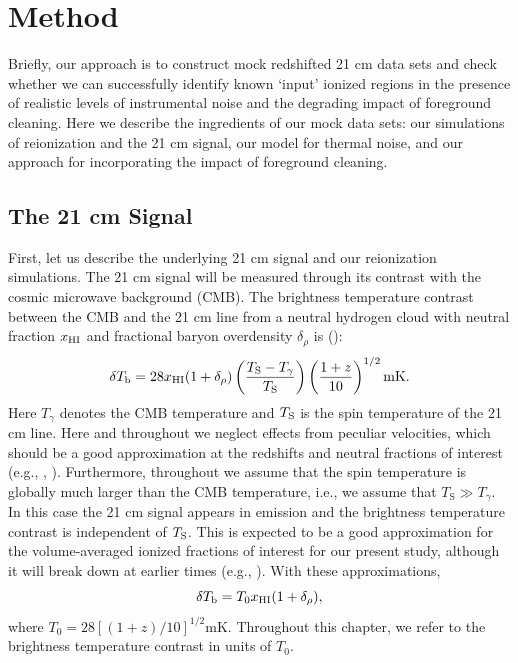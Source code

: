 \section{Method} \label{sec:Bubblemethod}
 
Briefly, our approach is to construct mock redshifted 21 cm data sets and check whether we
can successfully identify known `input' 
ionized regions in the presence of realistic levels of instrumental noise and the degrading impact
of foreground cleaning. Here we describe the ingredients of our mock data sets: our
simulations of reionization and the 21 cm signal, our model for thermal noise, and
our approach for incorporating the impact of foreground cleaning. 


\subsection{The 21 cm Signal} \label{sec:Bubble21cm}

First, let us describe the underlying 21 cm signal and our reionization simulations.
The 21 cm signal will be measured through its contrast with the cosmic microwave background (CMB). The brightness temperature contrast
between the CMB and the 21 cm line from a neutral hydrogen cloud with neutral fraction $x_{\text{HI}}$ and fractional baryon overdensity
$\delta_\rho$ is (\citealt{Zaldarriaga:2003du}):
\begin{equation}
\delta T_{\text{b}} = 28 x_{\text{HI}} (1 + \delta_{\rho})\left( \frac{T_{\text{S}} - T_{\gamma}}{T_{\text{S}}} \right) \left( \frac{1 + z}{10} \right)^{1/2}\text{mK}.
\end{equation}
Here $T_\gamma$ denotes the CMB temperature and $T_{\rm S}$ is the spin temperature of the 21 cm line. Here and throughout
we neglect effects from peculiar velocities, which should be a good approximation at the redshifts and neutral fractions
of interest (e.g., \citealt{Mesinger:2007pd}, \citealt{Mao:2011xp}). Furthermore, throughout we assume that the spin temperature is globally much larger than
the CMB temperature, i.e., we assume that
$T_{\text{S}} \gg T_{\gamma}$. In this case the 21 cm signal appears in emission and the brightness temperature contrast
is independent of $T_{\rm S}$. This is expected to be a good approximation for the volume-averaged ionized fractions of interest for our
present study, although it will break down at earlier times (e.g., \citealt{Ciardi:2003hg}). With these approximations, 
\begin{equation}
\delta T_{\text{b}} = T_{0} x_{\text{HI}} (1 + \delta_{\rho}), \label{eq:21cm}
\end{equation}
 where $T_{0} = 28\left[ (1+z)/10 \right]^{1/2}$mK. Throughout this chapter, we refer to the brightness temperature contrast 
in units of $T_{0}$.


